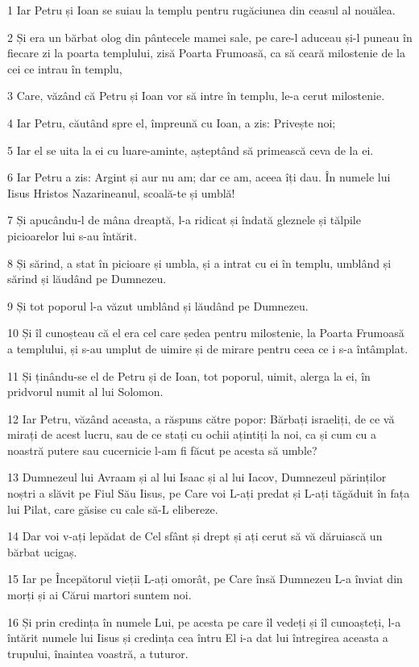 \par 1 Iar Petru și Ioan se suiau la templu pentru rugăciunea din ceasul al nouălea.
\par 2 Și era un bărbat olog din pântecele mamei sale, pe care-l aduceau și-l puneau în fiecare zi la poarta templului, zisă Poarta Frumoasă, ca să ceară milostenie de la cei ce intrau în templu,
\par 3 Care, văzând că Petru și Ioan vor să intre în templu, le-a cerut milostenie.
\par 4 Iar Petru, căutând spre el, împreună cu Ioan, a zis: Privește noi;
\par 5 Iar el se uita la ei cu luare-aminte, așteptând să primească ceva de la ei.
\par 6 Iar Petru a zis: Argint și aur nu am; dar ce am, aceea îți dau. În numele lui Iisus Hristos Nazarineanul, scoală-te și umblă!
\par 7 Și apucându-l de mâna dreaptă, l-a ridicat și îndată gleznele și tălpile picioarelor lui s-au întărit.
\par 8 Și sărind, a stat în picioare și umbla, și a intrat cu ei în templu, umblând și sărind și lăudând pe Dumnezeu.
\par 9 Și tot poporul l-a văzut umblând și lăudând pe Dumnezeu.
\par 10 Și îl cunoșteau că el era cel care ședea pentru milostenie, la Poarta Frumoasă a templului, și s-au umplut de uimire și de mirare pentru ceea ce i s-a întâmplat.
\par 11 Și ținându-se el de Petru și de Ioan, tot poporul, uimit, alerga la ei, în pridvorul numit al lui Solomon.
\par 12 Iar Petru, văzând aceasta, a răspuns către popor: Bărbați israeliți, de ce vă mirați de acest lucru, sau de ce stați cu ochii ațintiți la noi, ca și cum cu a noastră putere sau cucernicie l-am fi făcut pe acesta să umble?
\par 13 Dumnezeul lui Avraam și al lui Isaac și al lui Iacov, Dumnezeul părinților noștri a slăvit pe Fiul Său Iisus, pe Care voi L-ați predat și L-ați tăgăduit în fața lui Pilat, care găsise cu cale să-L elibereze.
\par 14 Dar voi v-ați lepădat de Cel sfânt și drept și ați cerut să vă dăruiască un bărbat ucigaș.
\par 15 Iar pe Începătorul vieții L-ați omorât, pe Care însă Dumnezeu L-a înviat din morți și ai Cărui martori suntem noi.
\par 16 Și prin credința în numele Lui, pe acesta pe care îl vedeți și îl cunoașteți, l-a întărit numele lui Iisus și credința cea întru El i-a dat lui întregirea aceasta a trupului, înaintea voastră, a tuturor.
